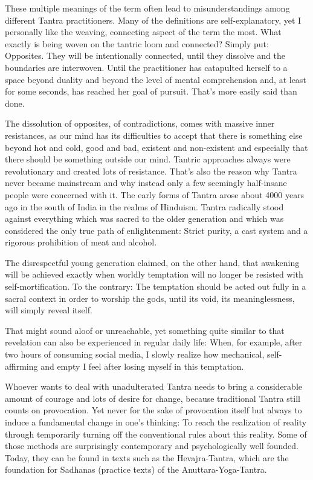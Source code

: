 These multiple meanings of the term often lead to misunderstandings among different Tantra practitioners. Many of the definitions are self-explanatory, yet I personally like the weaving, connecting aspect of the term the most. What exactly is being woven on the tantric loom and connected? Simply put: Opposites. They will be intentionally connected, until they dissolve and the boundaries are interwoven. Until the practitioner has catapulted herself to a space beyond duality and beyond the level of mental comprehension and, at least for some seconds, has reached her goal of pursuit. That's more easily said than done.

The dissolution of opposites, of contradictions, comes with massive inner resistances, as our mind has its difficulties to accept that there is something else beyond hot and cold, good and bad, existent and non-existent and especially that there should be something outside our mind. Tantric approaches always were revolutionary and created lots of resistance. That's also the reason why Tantra never became mainstream and why instead only a few seemingly half-insane people were concerned with it.
The early forms of Tantra arose about 4000 years ago in the south of India in the realms of Hinduism. Tantra radically stood against everything which was sacred to the older generation and which was considered the only true path of enlightenment: Strict purity, a cast system and a rigorous prohibition of meat and alcohol.

The disrespectful young generation claimed, on the other hand, that awakening will be  achieved exactly when worldly temptation will no longer be resisted with self-mortification. To the contrary: The temptation should be acted out fully in a sacral context in order to worship the gods, until its void, its meaninglessness, will simply reveal itself.

That might sound aloof or unreachable, yet something quite similar to that revelation can also be experienced in regular daily life: When, for example, after two hours of consuming social media, I slowly realize how mechanical, self-affirming and empty I feel after losing myself in this temptation.

Whoever wants to deal with unadulterated Tantra needs to bring a considerable amount of courage and lots of desire for change, because traditional Tantra still counts on provocation. Yet never for the sake of provocation itself but always to induce a fundamental change in one's thinking: To reach the realization of reality through temporarily turning off the conventional rules about this reality.
Some of those methods are surprisingly contemporary and psychologically well founded. Today, they can be found in texts such as the Hevajra-Tantra, which are the foundation for Sadhanas (practice texts) of the Anuttara-Yoga-Tantra.

